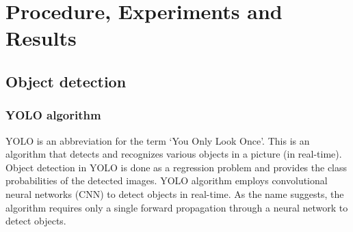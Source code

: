 \documentclass[conference]{IEEEtran}
\begin{document}
\section{Procedure, Experiments and Results}
\subsection{Object detection}
\subsubsection{\textbf{YOLO algorithm}}
YOLO is an abbreviation for the term ‘You Only Look Once’. This is an algorithm that detects and recognizes various objects in a picture (in real-time). Object detection in YOLO is done as a regression problem and provides the class probabilities of the detected images. YOLO algorithm employs convolutional neural networks (CNN) to detect objects in real-time. As the name suggests, the algorithm requires only a single forward propagation through a neural network to detect objects.
\end{document}
